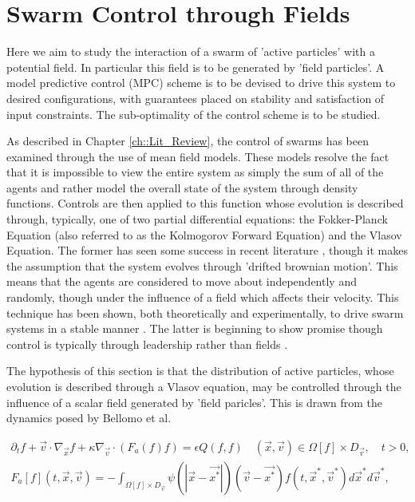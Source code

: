 \documentclass[.../main.tex]{subfiles}
\begin{document}
	


    \section{Swarm Control through Fields} \label{sec::Swarm_Field_Control}

    Here we aim to study the interaction of a swarm of 'active particles' with a potential field. In
    particular this field is to be generated by 'field particles'. A model predictive control 
    (MPC) scheme
    is to be devised to drive this system to desired configurations, with guarantees placed on
    stability and satisfaction of input constraints. The sub-optimality of the control
    scheme is to be studied.

    As described in Chapter \ref{ch::Lit_Review}, the control of swarms has been examined through the
    use of
    mean field models. These models resolve the fact that it is impossible to view the entire system
    as simply the sum of all of the agents and rather model the overall state of the system through
    density functions. Controls are then applied to this function whose evolution is described
    through, typically, one of two partial differential equations: the Fokker-Planck Equation (also
    referred to as the Kolmogorov Forward Equation) and the Vlasov Equation. The former has seen
    some success in recent literature \cite{Elamvazhuthi2019, Li2017,
    Roy2017}, though it makes the assumption that the system evolves through 'drifted
    brownian motion'. This means that the agents are considered to move about independently and
    randomly, though under the influence of a field which affects their velocity. This technique
	has been shown, both theoretically and experimentally, to drive swarm systems in a stable
	manner \cite{Fleig}. The latter is beginning to show promise 
	though control is typically through leadership rather than fields \cite{Burger2019}. 

	The hypothesis of this section is that the distribution of active particles, whose evolution is
	described through a Vlasov equation, may be controlled through the influence of a scalar field
	generated by 'field paricles'. This is drawn from the dynamics posed by Bellomo et al. 
	\cite{Bellomo2017}

	\begin{equation}
	\label{eqn::Vlasov}
    \begin{split}    
        \partial_t f + \Vec{v} \cdot \nabla_{\Vec{x}} f + \kappa \nabla_{\Vec{v}} \cdot (F_a (f) f)
        = \epsilon Q(f, f) \quad  (\Vec{x}, \Vec{v}) \in \Omega[f] \times D_{\Vec{v}}, \quad t>0, \\
        F_a[f](t, \Vec{x}, \Vec{v}) = - \int_{\Omega [f] \times D_{\Vec{v}}} \psi (|\Vec{x} - \Vec
        {x^*}|)(\Vec{v} - \Vec{x^*}) f(t, \Vec{x}^*, \Vec{v}^*) d\Vec{x}^* d\Vec{v}^*, 
    \end{split}
    \end{equation}
\end{document}
